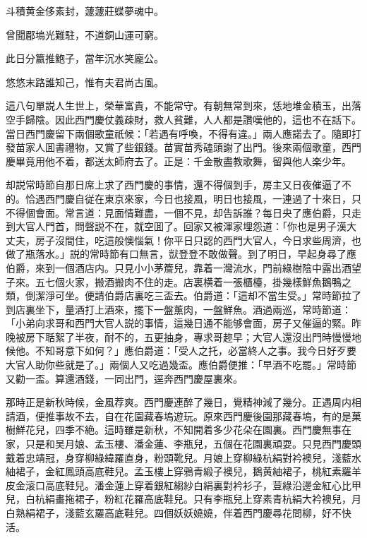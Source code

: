 斗積黄金侈素封，蘧蘧莊蝶夢魂中。

曾聞郿塢光難駐，不道銅山運可窮。

此日分籝推鮑子，當年沉水笑龐公。

悠悠末路誰知己，惟有夫君尚古風。

這八句單説人生世上，榮華富貴，不能常守。有朝無常到來，恁地堆金積玉，出落空手歸陰。因此西門慶仗義疎財，救人貧難，人人都是讚嘆他的，這也不在話下。當日西門慶留下兩個歌童祇候：「若遇有呼喚，不得有違。」兩人應諾去了。隨即打發苗家人囬書禮物，又賞了些銀錢。苗實苗秀磕頭謝了出門。後來兩個歌童，西門慶畢竟用他不着，都送太師府去了。正是：千金散盡教歌舞，留與他人楽少年。

却説常時節自那日席上求了西門慶的事情，還不得個到手，房主又日夜催逼了不的。恰遇西門慶自従在東京來家，今日也接風，明日也接風，一連過了十來日，只不得個會面。常言道：見面情難盡，一個不見，却告訴誰？每日央了應伯爵，只走到大官人門首，問聲説不在，就空囬了。回家又被渾家埋怨道：「你也是男子漢大丈夫，房子沒間住，吃這般懊惱氣！你平日只認的西門大官人，今日求些周濟，也做了瓶落水。」説的常時節有口無言，獃登登不敢做聲。到了明日，早起身尋了應伯爵，來到一個酒店内。只見小小茅簷兒，靠着一灣流水，門前綠樹陰中露出酒望子來。五七個火家，搬酒搬肉不住的走。店裏横着一張櫃檯，掛幾樣鮮魚鵝鴨之類，倒潔淨可坐。便請伯爵店裏吃三盃去。伯爵道：「這却不當生受。」常時節拉了到店裏坐下，量酒打上酒來，擺下一盤薰肉，一盤鮮魚。酒過兩巡，常時節道：「小弟向求哥和西門大官人説的事情，這幾日通不能够會面，房子又催逼的緊。昨晚被房下聒絮了半夜，耐不的，五更抽身，專求哥趂早；大官人還沒出門時慢慢地候他。不知哥意下如何？」應伯爵道：「受人之托，必當終人之事。我今日好歹要大官人助你些就是了。」兩個人又吃過幾盃。應伯爵便推：「早酒不吃罷。」常時節又勸一盃。算還酒錢，一同出門，逕奔西門慶屋裏來。

那時正是新秋時候，金風荐爽。西門慶連醉了幾日，覺精神減了幾分。正遇周内相請酒，便推事故不去，自在花園藏春塢遊玩。原來西門慶後園那藏春塢，有的是菓樹鮮花兒，四季不絶。這時雖是新秋，不知開着多少花朵在園裏。西門慶無事在家，只是和吴月娘、孟玉樓、潘金蓮、李瓶兒，五個在花園裏頑耍。只見西門慶頭戴着忠靖冠，身穿柳綠緯羅直身，粉頭靴兒。月娘上穿柳綠杭絹對衿襖兒，淺藍水紬裙子，金紅鳳頭高底鞋兒。孟玉樓上穿鴉青緞子襖兒，鵝黄紬裙子，桃紅素羅羊皮金滚口高底鞋兒。潘金蓮上穿着銀紅縐紗白絹裏對衿衫子，荳綠沿邊金紅心比甲兒，白杭絹畫拖裙子，粉紅花羅高底鞋兒。只有李瓶兒上穿素青杭絹大衿襖兒，月白熟絹裙子，淺藍玄羅高底鞋兒。四個妖妖嬈嬈，伴着西門慶尋花問柳，好不快活。

